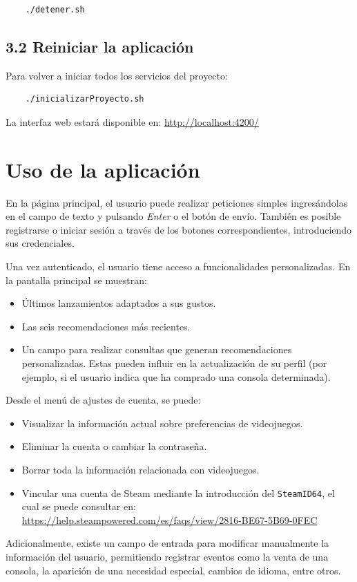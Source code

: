 \begin{verbatim}
	./detener.sh
\end{verbatim}

\subsection*{3.2 Reiniciar la aplicación}

Para volver a iniciar todos los servicios del proyecto:

\begin{verbatim}
	./inicializarProyecto.sh
\end{verbatim}

\noindent La interfaz web estará disponible en: \url{http://localhost:4200/}

\newpage
\section*{Uso de la aplicación}

En la página principal, el usuario puede realizar peticiones simples ingresándolas en el campo de texto y pulsando \textit{Enter} o el botón de envío. También es posible registrarse o iniciar sesión a través de los botones correspondientes, introduciendo sus credenciales.

Una vez autenticado, el usuario tiene acceso a funcionalidades personalizadas. En la pantalla principal se muestran:

\begin{itemize}
	\item Últimos lanzamientos adaptados a sus gustos.
	\item Las seis recomendaciones más recientes.
	\item Un campo para realizar consultas que generan recomendaciones personalizadas. Estas pueden influir en la actualización de su perfil (por ejemplo, si el usuario indica que ha comprado una consola determinada).
\end{itemize}

Desde el menú de ajustes de cuenta, se puede:

\begin{itemize}
	\item Visualizar la información actual sobre preferencias de videojuegos.
	\item Eliminar la cuenta o cambiar la contraseña.
	\item Borrar toda la información relacionada con videojuegos.
	\item Vincular una cuenta de Steam mediante la introducción del \texttt{SteamID64}, el cual se puede consultar en: \url{https://help.steampowered.com/es/faqs/view/2816-BE67-5B69-0FEC}
\end{itemize}

Adicionalmente, existe un campo de entrada para modificar manualmente la información del usuario, permitiendo registrar eventos como la venta de una consola, la aparición de una necesidad especial, cambios de idioma, entre otros.
